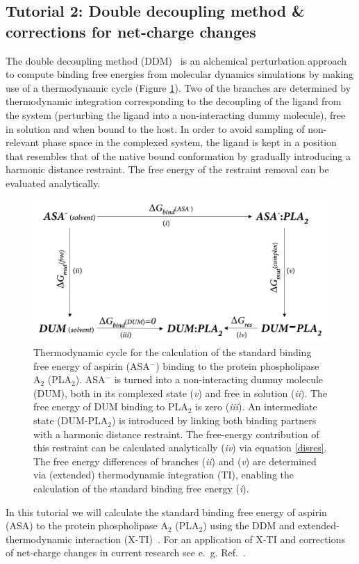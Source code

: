 
\subsection{Tutorial 2: Double decoupling method \& corrections for net-charge changes}
The double decoupling method (DDM)~\cite{DDM} is an alchemical perturbation approach to compute binding free energies from molecular dynamics simulations by making use of a thermodynamic cycle (Figure \ref{TC_ASA}). Two of the branches are determined by thermodynamic integration corresponding to the decoupling of the ligand from the system (perturbing the ligand into a non-interacting dummy molecule), free in solution and when bound to the host. In order to avoid sampling of non-relevant phase space in the complexed system, the ligand is kept in a position that resembles that of the native bound conformation by gradually introducing a harmonic distance restraint. The free energy of the restraint removal can be evaluated analytically.

\begin{figure}[H]
    \centering
    \includegraphics[scale=0.21]{../05_tutorial_02/figures/TC_ASA.png}
    \caption{Thermodynamic cycle for the calculation of the standard binding free energy of aspirin (ASA$^-$) binding to the protein phospholipase A$_2$ (PLA$_2$). ASA$^-$ is turned into a non-interacting dummy molecule (DUM), both in its complexed state (\textit{v}) and free in solution (\textit{ii}). The free energy of DUM binding to PLA$_2$ is zero (\textit{iii}). An intermediate state (DUM-PLA$_2$) is introduced by linking both binding partners with a harmonic distance restraint. The free-energy contribution of this restraint can be calculated analytically (\textit{iv}) via equation \ref{disres}. The free energy differences of branches (\textit{ii}) and (\textit{v}) are determined via (extended) thermodynamic integration (TI), enabling the calculation of the standard binding free energy (\textit{i}).}
    \label{TC_ASA}
\end{figure}
%
In this tutorial we will calculate the standard binding free energy of aspirin (ASA) to the protein phospholipase A$_2$ (PLA$_2$) using the DDM and extended-thermodynamic interaction (X-TI)~\cite{X_TI}. 
For an application of X-TI and corrections of net-charge changes in current research see e.~g. Ref.~\cite{Ohlknecht_2020b}.

